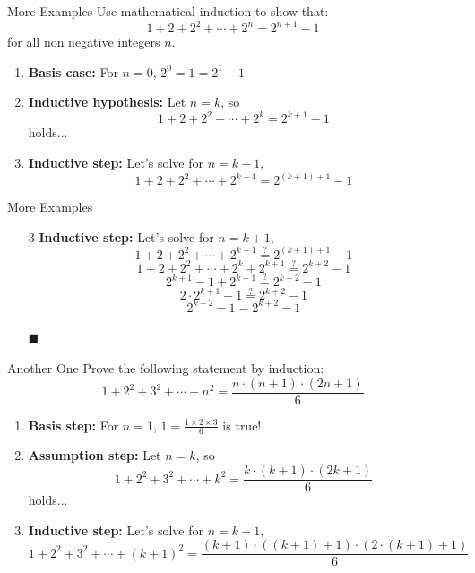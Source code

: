 \documentclass[aspectratio=169]{beamer}
\renewcommand{\qed}{\\ \hfill $\blacksquare$}
\begin{document}
\begin{frame}{More Examples}
    \footnotesize
    Use mathematical induction to show that:
    $$
        1 + 2 + 2^2 + \cdots + 2^n = 2^{n + 1} - 1
    $$
    for all non negative integers $n$.

   \begin{enumerate}[<+->]
        \item \textbf{Basis case:} For $n = 0$, $2^0 = 1 = 2^1 - 1$ \checkmark
        \item \textbf{Inductive hypothesis:} Let $n = k$, so $$ 1 + 2 + 2^2 + \cdots + 2^k = 2^{k + 1} - 1 $$ holds...
        \item \textbf{Inductive step:} Let's solve for $n = k + 1$,
        $$
            1 + 2 + 2^2 + \cdots + 2^{k + 1} = 2^{(k + 1) + 1} - 1
        $$
   \end{enumerate}
\end{frame}

\begin{frame}{More Examples}
    \footnotesize
    \begin{enumerate}
        \item[3] \textbf{Inductive step:} Let's solve for $n = k + 1$, \pause
            $$ 1 + 2 + 2^2 + \cdots + 2^{k + 1} \stackrel{?}{=} 2^{(k + 1) + 1} - 1$$ \pause
            $$ 1 + 2 + 2^2 + \cdots + 2^k + 2^{k + 1} \stackrel{?}{=} 2^{k + 2} - 1$$ \pause
            $$ 2^{k + 1} - 1 + 2^{k + 1} \stackrel{?}{=} 2^{k + 2} - 1 $$ \pause
            $$ 2 \cdot 2^{k + 1} - 1 \stackrel{?}{=} 2^{k + 2} - 1 $$ \pause
            $$ 2^{k + 2} - 1 = 2^{k + 2} - 1 $$ \qed
    \end{enumerate}
\end{frame}

\begin{frame}{Another One}
    \footnotesize
    Prove the following statement by induction:
    $$
        1 + 2^2 + 3^2 + \cdots + n^2 = \frac{n \cdot (n + 1) \cdot (2n + 1)}{6}
    $$
    \begin{enumerate}[<+->]
        \item \textbf{Basis step:} For $n = 1$, $1 = \frac {1 \times 2 \times 3}{6}$ is true!
        \item \textbf{Assumption step:} Let $n = k$, so $$ 1 + 2^2 + 3^2 + \cdots + k^2 = \frac{k \cdot (k + 1) \cdot (2k + 1)}{6} $$ holds...
        \item \textbf{Inductive step:} Let's solve for $n = k + 1$,
        $$ 1 + 2^2 + 3^2 + \cdots + (k + 1)^2 = \frac{(k + 1) \cdot ((k + 1) + 1) \cdot (2 \cdot (k + 1) + 1)}{6} $$
    \end{enumerate}
\end{frame}
\end{document}
